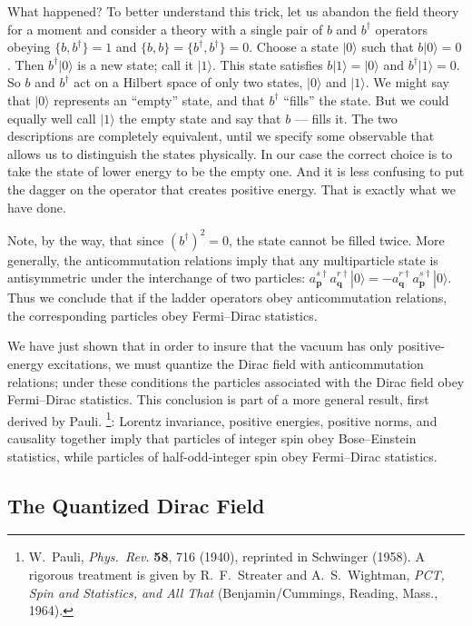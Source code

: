 What happened?  To better understand this trick, let us abandon the field
theory for a moment and consider a theory with a single pair of $b$ and
$b^\dagger$ operators obeying $\{b,b^\dagger\} = 1$ and $\{b,b\} =
\{b^\dagger,b^\dagger\} = 0$.  Choose a state $|0\rangle$ such that $b|0\rangle = 0$.
Then $b^\dagger|0\rangle$ is a new state; call it $|1\rangle$.  This state
satisfies $b|1\rangle = |0\rangle$ and $b^\dagger|1\rangle = 0$.  So $b$ and
$b^\dagger$ act on a Hilbert space of only two states, $|0\rangle$ and
$|1\rangle$.  We might say that $|0\rangle$ represents an ``empty'' state, and
that $b^\dagger$ ``fills'' the state.  But we could equally well call
$|1\rangle$ the empty state and say that $b$ --- fills it.  The two
descriptions are completely equivalent, until we specify some observable that
allows us to distinguish the states physically.  In our case the correct
choice is to take the state of lower energy to be the empty one.  And it is
less confusing to put the dagger on the operator that creates positive
energy.  That is exactly what we have done.

Note, by the way, that since $(b^\dagger)^2 = 0$, the state cannot be filled
twice.  More generally, the anticommutation relations imply that any
multiparticle state is antisymmetric under the interchange of two particles:
$a_{\mathbf{p}}^{s\dagger}a_{\mathbf{q}}^{r\dagger}|0\rangle =
-a_{\mathbf{q}}^{r\dagger}a_{\mathbf{p}}^{s\dagger}|0\rangle$.  Thus we
conclude that if the ladder operators obey anticommutation relations, the
corresponding particles obey Fermi--Dirac statistics.

We have just shown that in order to insure that the vacuum has only
positive-energy excitations, we must quantize the Dirac field with
anticommutation relations; under these conditions the particles associated
with the Dirac field obey Fermi--Dirac statistics.  This conclusion is part
of a more general result, first derived by Pauli.%
\footnote{W.~Pauli, \emph{Phys.\ Rev.} \textbf{58}, 716 (1940), reprinted in
Schwinger (1958).  A rigorous treatment is given by R.~F.~Streater and
A.~S.~Wightman, \emph{PCT, Spin and Statistics, and All That}
(Benjamin/Cummings, Reading, Mass., 1964).}: Lorentz invariance, positive
energies, positive norms, and causality together imply that particles of
integer spin obey Bose--Einstein statistics, while particles of half-odd-integer
spin obey Fermi--Dirac statistics.

\subsection{The Quantized Dirac Field}

